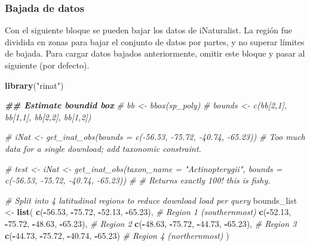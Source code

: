 \documentclass[sn-apa,pdflatex]{sn-jnl}
\newenvironment{Shaded}{\begin{snugshade}}{\end{snugshade}}
\newcommand{\CommentTok}[1]{\textcolor[rgb]{0.56,0.35,0.01}{\textit{#1}}}
\newcommand{\DocumentationTok}[1]{\textcolor[rgb]{0.56,0.35,0.01}{\textbf{\textit{#1}}}}
\newcommand{\FloatTok}[1]{\textcolor[rgb]{0.00,0.00,0.81}{#1}}
\newcommand{\FunctionTok}[1]{\textcolor[rgb]{0.13,0.29,0.53}{\textbf{#1}}}
\newcommand{\NormalTok}[1]{#1}
\newcommand{\OtherTok}[1]{\textcolor[rgb]{0.56,0.35,0.01}{#1}}
\newcommand{\SpecialCharTok}[1]{\textcolor[rgb]{0.81,0.36,0.00}{\textbf{#1}}}
\newcommand{\StringTok}[1]{\textcolor[rgb]{0.31,0.60,0.02}{#1}}
\begin{document}
\subsubsection{Bajada de datos}\label{bajada-de-datos-1}

Con el siguiente bloque se pueden bajar los datos de iNaturalist. La
región fue dividida en zonas para bajar el conjunto de datos por partes,
y no superar límites de bajada. Para cargar datos bajados anteriormente,
omitir este bloque y pasar al siguiente (por defecto).

\begin{Shaded}
\begin{Highlighting}[]
\FunctionTok{library}\NormalTok{(}\StringTok{"rinat"}\NormalTok{)}

\DocumentationTok{\#\# Estimate boundid box}
\CommentTok{\# bb \textless{}{-} bbox(sp\_poly)}
\CommentTok{\# bounds \textless{}{-} c(bb[2,1], bb[1,1], bb[2,2], bb[1,2])}

\CommentTok{\# iNat \textless{}{-} get\_inat\_obs(bounds = c({-}56.53, {-}75.72, {-}40.74, {-}65.23))}
\CommentTok{\# Too much data for a single download; add taxonomic constraint.}

\CommentTok{\# test \textless{}{-} iNat \textless{}{-} get\_inat\_obs(taxon\_name = "Actinopterygii", bounds = c({-}56.53, {-}75.72, {-}40.74, {-}65.23))}
\CommentTok{\# \# Returns exactly 100! this is fishy. }

\CommentTok{\# Split into 4 latitudinal regions to reduce download load per query }
\NormalTok{bounds\_list }\OtherTok{\textless{}{-}} \FunctionTok{list}\NormalTok{(}
  \FunctionTok{c}\NormalTok{(}\SpecialCharTok{{-}}\FloatTok{56.53}\NormalTok{, }\SpecialCharTok{{-}}\FloatTok{75.72}\NormalTok{, }\SpecialCharTok{{-}}\FloatTok{52.13}\NormalTok{, }\SpecialCharTok{{-}}\FloatTok{65.23}\NormalTok{),  }\CommentTok{\# Region 1 (southernmost)}
  \FunctionTok{c}\NormalTok{(}\SpecialCharTok{{-}}\FloatTok{52.13}\NormalTok{, }\SpecialCharTok{{-}}\FloatTok{75.72}\NormalTok{, }\SpecialCharTok{{-}}\FloatTok{48.63}\NormalTok{, }\SpecialCharTok{{-}}\FloatTok{65.23}\NormalTok{),  }\CommentTok{\# Region 2}
  \FunctionTok{c}\NormalTok{(}\SpecialCharTok{{-}}\FloatTok{48.63}\NormalTok{, }\SpecialCharTok{{-}}\FloatTok{75.72}\NormalTok{, }\SpecialCharTok{{-}}\FloatTok{44.73}\NormalTok{, }\SpecialCharTok{{-}}\FloatTok{65.23}\NormalTok{),  }\CommentTok{\# Region 3}
  \FunctionTok{c}\NormalTok{(}\SpecialCharTok{{-}}\FloatTok{44.73}\NormalTok{, }\SpecialCharTok{{-}}\FloatTok{75.72}\NormalTok{, }\SpecialCharTok{{-}}\FloatTok{40.74}\NormalTok{, }\SpecialCharTok{{-}}\FloatTok{65.23}\NormalTok{)   }\CommentTok{\# Region 4 (northernmost)}
\NormalTok{)}


\end{Highlighting}
\end{Shaded}
\end{document}
